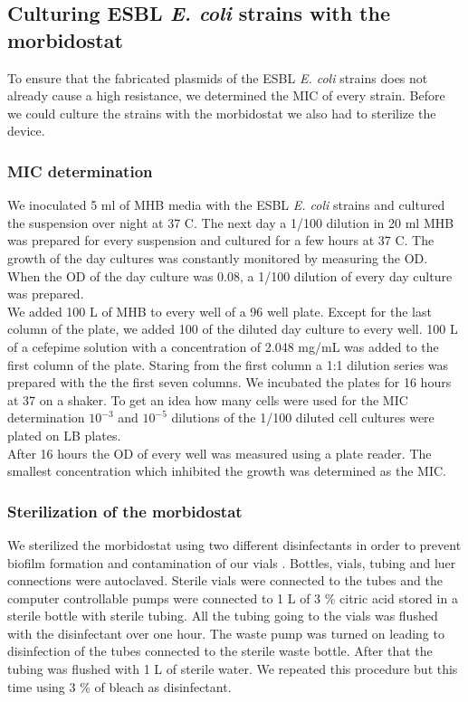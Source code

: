 \subsection{Culturing ESBL \textit{E. coli} strains with the morbidostat}
To ensure that the fabricated plasmids of the ESBL \textit{E. coli} strains does not already cause a high resistance, we determined the MIC of every strain. Before we could culture the strains with the morbidostat we also had to sterilize the device. 

\subsubsection{MIC determination}
We inoculated 5 ml of MHB media with the ESBL \textit{E. coli} strains and cultured the suspension over night at 37 \degree C. The next day a 1/100 dilution in 20 ml MHB was prepared for every suspension and cultured for a few hours at 37 \degree C. The growth of the day cultures was constantly monitored by measuring the OD. When the OD of the day culture was 0.08, a 1/100 dilution of every day culture was prepared. \\
We added 100 \textmu L of MHB to every well of a 96 well plate. Except for the last column of the plate, we added 100 \textmu of the diluted day culture to every well. 100 \textmu L of a cefepime solution with a concentration of 2.048 mg/mL was added to the first column of the plate. Staring from the first column a 1:1 dilution series was prepared with the the first seven columns. We incubated the plates for 16 hours at 37 \degree \space on a shaker. To get an idea how many cells were used for the MIC determination $10^{-3}$ and $10^{-5}$ dilutions of the 1/100 diluted cell cultures were plated on LB plates.\\
After 16 hours the OD of every well was measured using a plate reader. The smallest concentration which inhibited the growth was determined as the MIC. 
\label{section:mic_determination}

\subsubsection{Sterilization of the morbidostat}
We sterilized the morbidostat using two different disinfectants in order to prevent biofilm formation and contamination of our vials .
Bottles, vials, tubing and luer connections were autoclaved. Sterile vials were connected to the tubes and the computer controllable pumps were connected to 1 L of 3 \% citric acid stored in a sterile bottle with sterile tubing. All the tubing going to the vials was flushed with the disinfectant over one hour. The waste pump was turned on leading to disinfection of the tubes connected to the sterile waste bottle. After that the tubing was flushed with 1 L of sterile water. We repeated this procedure but this time using 3 \% of bleach as disinfectant.
\label{section:sterilization}

